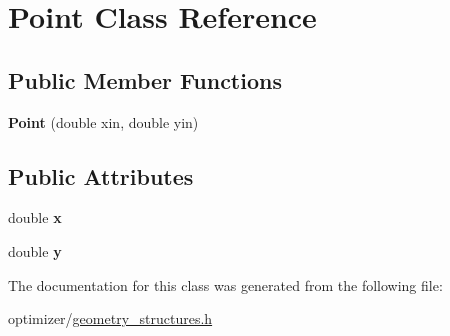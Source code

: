 \hypertarget{class_point}{}\section{Point Class Reference}
\label{class_point}
\subsection*{Public Member Functions}
\begin{DoxyCompactItemize}
\item 
\hypertarget{class_point_a2a0253a42cde677081c10532edcfc65f}{}\label{class_point_a2a0253a42cde677081c10532edcfc65f} 
{\bfseries Point} (double xin, double yin)
\end{DoxyCompactItemize}
\subsection*{Public Attributes}
\begin{DoxyCompactItemize}
\item 
\hypertarget{class_point_ab99c56589bc8ad5fa5071387110a5bc7}{}\label{class_point_ab99c56589bc8ad5fa5071387110a5bc7} 
double {\bfseries x}
\item 
\hypertarget{class_point_afa38be143ae800e6ad69ce8ed4df62d8}{}\label{class_point_afa38be143ae800e6ad69ce8ed4df62d8} 
double {\bfseries y}
\end{DoxyCompactItemize}


The documentation for this class was generated from the following file\+:\begin{DoxyCompactItemize}
\item 
optimizer/\hyperlink{geometry__structures_8h}{geometry\+\_\+structures.\+h}\end{DoxyCompactItemize}
